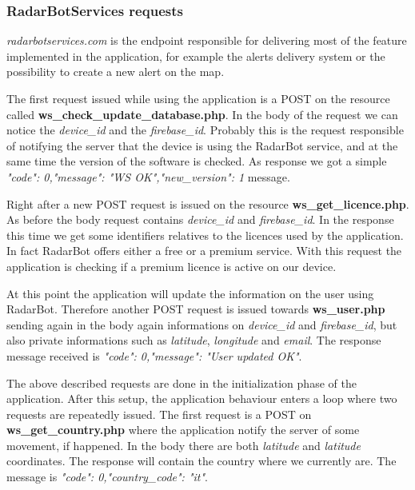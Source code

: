 		\newpage
		\subsubsection{RadarBotServices requests}
			\par \textit{radarbotservices.com} is the endpoint responsible for delivering most of the feature implemented in the application, for example the alerts delivery system or the possibility to create a new alert on the map. \newline
			\par The first request issued while using the application is a POST on the resource called \textbf{ws\_check\_update\_database.php}. In the body of the request we can notice the \textit{device\_id} and the \textit{firebase\_id}. Probably this is the request responsible of notifying the server that the device is using the RadarBot service, and at the same time the version of the software is checked. As response we got a simple \textit{"code": 0,"message": "WS OK","new\_version": 1} message.\newline
			\par Right after a new POST request is issued on the resource \textbf{ws\_get\_licence.php}. As before the body request contains \textit{device\_id} and \textit{firebase\_id}. In the response this time we get some identifiers relatives to the licences used by the application. In fact RadarBot offers either a free or a premium service. With this request the application is checking if a premium licence is active on our device.\newline
			\par At this point the application will update the information on the user using RadarBot. Therefore another POST request is issued towards \textbf{ws\_user.php} sending again in the body again informations on  \textit{device\_id} and \textit{firebase\_id}, but also private informations such as \textit{latitude}, \textit{longitude} and \textit{email}. The response message received is \textit{"code": 0,"message": "User updated OK"}.\newline
			\par The above described requests are done in the initialization phase of the application. After this setup, the application behaviour enters a loop where two requests are repeatedly issued. \newline
			The first request is a POST on \textbf{ws\_get\_country.php} where the application notify the server of some movement, if happened. In the body there are both \textit{latitude} and \textit{latitude} coordinates. The response will contain the country where we currently are. The message is \textit{"code": 0,"country\_code": "it"}. \newline
